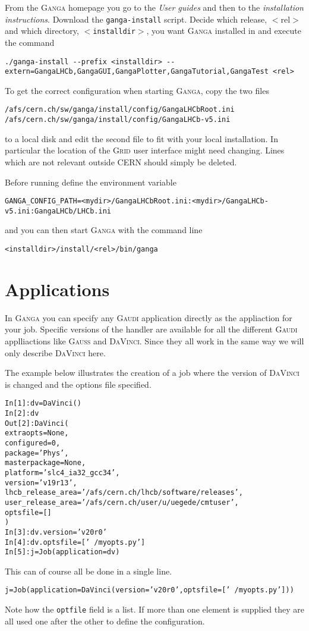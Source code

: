\documentclass{howto}
\def\ganga {\textsc{Ganga}\xspace}
\def\gaudi {\textsc{Gaudi}\xspace}
\def\davinci {\textsc{DaVinci}\xspace}
\def\gauss {\textsc{Gauss}\xspace}
\def\grid {\textsc{Grid}\xspace}
\def\davinciv {v20r0\xspace}
\begin{document}
From the \ganga homepage you go to the \textit{User guides} and then to the
\textit{installation instructions}. Download the \texttt{ganga-install}
script. Decide which release, $<$rel$>$ and which directory,
\texttt{$<$installdir$>$}, you want \ganga installed in and execute the
command
\begin{verbatim}
./ganga-install --prefix <installdir> --extern=GangaLHCb,GangaGUI,GangaPlotter,GangaTutorial,GangaTest <rel>
\end{verbatim}

To get the correct configuration when starting \ganga, copy the two files
\begin{verbatim}
/afs/cern.ch/sw/ganga/install/config/GangaLHCbRoot.ini
/afs/cern.ch/sw/ganga/install/config/GangaLHCb-v5.ini
\end{verbatim}
to a local disk and edit the second file to fit with your local
installation. In particular the location of the \grid user interface might
need changing. Lines which are not relevant outside CERN should simply be
deleted.

Before running define the environment variable
\begin{verbatim}
GANGA_CONFIG_PATH=<mydir>/GangaLHCbRoot.ini:<mydir>/GangaLHCb-v5.ini:GangaLHCb/LHCb.ini
\end{verbatim}
and you can then start \ganga with the command line
\begin{verbatim}
<installdir>/install/<rel>/bin/ganga
\end{verbatim}

\section{Applications}
\label{sec:gaudi}
In \ganga you can specify any \gaudi application directly as the appliaction
for your job. Specific versions of the handler are available for all the
different \gaudi applliactions like \gauss and \davinci. Since they all work
in the same way we will only describe \davinci here.

The example below illustrates the creation of a job where the version of
\davinci is changed and the options file specified.
\begin{alltt}
In [1]: dv = DaVinci()
In [2]: dv
Out[2]: DaVinci (
 extraopts = None ,
 configured = 0 ,
 package = 'Phys' ,
 masterpackage = None ,
 platform = 'slc4_ia32_gcc34' ,
 version = 'v19r13' ,
 lhcb_release_area = '/afs/cern.ch/lhcb/software/releases' ,
 user_release_area = '/afs/cern.ch/user/u/uegede/cmtuser' ,
 optsfile = []
 )
In [3]: dv.version='\davinciv'
In [4]: dv.optsfile=['~/myopts.py']
In [5]: j = Job(application=dv)
\end{alltt}
This can of course all be done in a single line.
\begin{alltt}
j = Job(application=DaVinci(version='\davinciv', optsfile=['~/myopts.py']))
\end{alltt}
Note how the \texttt{optfile} field is a list. If more than one element is
supplied they are all used one after the other to define the configuration.
\end{document}
